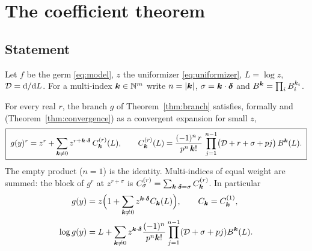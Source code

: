 \section{The coefficient theorem}
\label{sec:coefficients}

\subsection{Statement}

Let $f$ be the germ \eqref{eq:model}, $z$ the uniformizer \eqref{eq:uniformizer}, $L=\log z$, $\mathcal D=\mathrm d/\mathrm d L$. For a multi-index $\boldsymbol k\in\mathbb N^m$ write $n=|\boldsymbol k|$, $\sigma=\boldsymbol k\cdot\boldsymbol\delta$ and $B^{\boldsymbol k}=\prod_iB_i^{k_i}$.

\begin{theorem}
\label{thm:coefficients}
For every real $r$, the branch $g$ of Theorem~\ref{thm:branch} satisfies, formally and (Theorem~\ref{thm:convergence}) as a convergent expansion for small $z$,
\begin{equation}
 \boxed{\;g(y)^r=z^r+\sum_{\boldsymbol k\ne0}z^{r+\boldsymbol k\cdot\boldsymbol\delta}\,C^{(r)}_{\boldsymbol k}(L),\qquad
 C^{(r)}_{\boldsymbol k}(L)=\frac{(-1)^{n}\,r}{p^{n}\,\boldsymbol k!}\,\prod_{j=1}^{n-1}\bigl(\mathcal D+r+\sigma+pj\bigr)\,B^{\boldsymbol k}(L).\;}
 \label{eq:master}
\end{equation}
The empty product ($n=1$) is the identity. Multi-indices of equal weight are summed: the block of $g^r$ at $z^{r+\sigma}$ is $C^{(r)}_\sigma=\sum_{\boldsymbol k\cdot\boldsymbol\delta=\sigma}C^{(r)}_{\boldsymbol k}$. In particular
\begin{equation}
\begin{aligned}
 g(y)&=z\Bigl(1+\sum_{\boldsymbol k\ne0}z^{\boldsymbol k\cdot\boldsymbol\delta}C_{\boldsymbol k}(L)\Bigr),\qquad C_{\boldsymbol k}=C^{(1)}_{\boldsymbol k},\\
 \log g(y)&=L+\sum_{\boldsymbol k\ne0}z^{\boldsymbol k\cdot\boldsymbol\delta}\frac{(-1)^n}{p^n\boldsymbol k!}\prod_{j=1}^{n-1}(\mathcal D+\sigma+pj)B^{\boldsymbol k}(L).
\end{aligned}
 \label{eq:master-1-log}
\end{equation}
\end{theorem}
